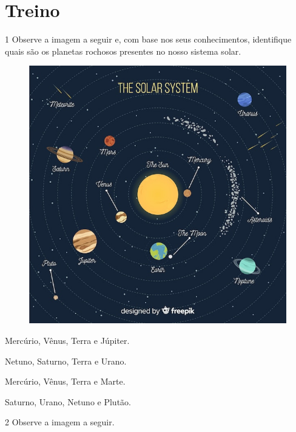 \section{Treino}

\num{1} Observe a imagem a seguir e, com base nos seus conhecimentos, identifique quais são os planetas rochosos presentes no nosso sistema solar.

\begin{figure}[htpb!]
\centering
\includegraphics[width=.6\textwidth]{./imgs/img12.jpg}
\end{figure}

\begin{escolha}
\item
  Mercúrio, Vênus, Terra e Júpiter.
\item
  Netuno, Saturno, Terra e Urano.
\item
  Mercúrio, Vênus, Terra e Marte.
\item
  Saturno, Urano, Netuno e Plutão.
\end{escolha}

\num{2} Observe a imagem a seguir.

